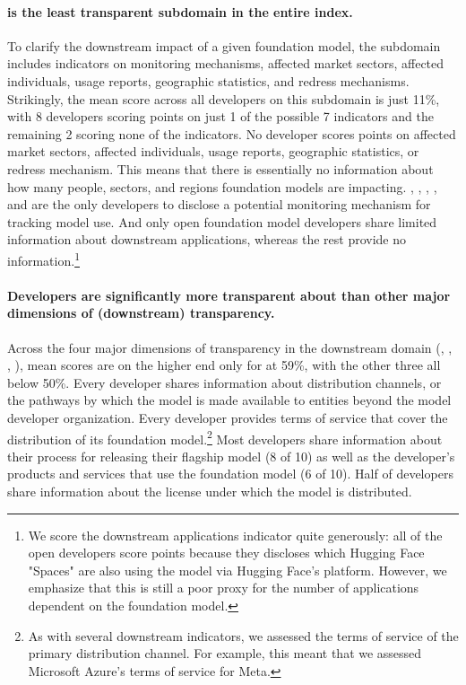 \documentclass[screen, authorversion, acmsmall]{acmart}
\begin{document}
\paragraph{\impact is the least transparent subdomain in the entire index.}
To clarify the downstream impact of a given foundation model, the \impact subdomain includes indicators on monitoring mechanisms, affected market sectors, affected individuals, usage reports, geographic statistics, and redress mechanisms.
Strikingly, the mean score across all developers on this subdomain is just 11\%, with 8 developers scoring points on just 1 of the possible 7 indicators and the remaining 2 scoring none of the indicators. 
No developer scores points on affected market sectors, affected individuals, usage reports, geographic statistics, or redress mechanism.
This means that there is essentially no information about how many people, sectors, and regions foundation models are impacting. 
\openai, \google, \cohere, \aitwentyone, and \inflection are the only developers to disclose a potential monitoring mechanism for tracking model use. 
And only open foundation model developers share limited information about downstream applications, whereas the rest provide no information.\footnote{We score the downstream applications indicator quite generously: all of the open developers score points because they discloses which Hugging Face "Spaces" are also using the model via Hugging Face's platform.
However, we emphasize that this is still a poor proxy for the number of applications dependent on the foundation model.} 

\paragraph{Developers are significantly more transparent about \distribution than other major dimensions of (downstream) transparency.}
Across the four major dimensions of transparency in the downstream domain (\distribution, \usagepolicy, \feedback, \impact), mean scores are on the higher end only for \distribution at 59\%, with the other three all below 50\%. 
Every developer shares information about distribution channels, or the pathways by which the model is made available to entities beyond the model developer organization.
Every developer provides terms of service that cover the distribution of its foundation model.\footnote{As with several downstream indicators, we assessed the terms of service of the primary distribution channel. For example, this meant that we assessed Microsoft Azure's terms of service for Meta.}
Most developers share information about their process for releasing their flagship model (8 of 10) as well as the developer's products and services that use the foundation model (6 of 10).
Half of developers share information about the license under which the model is distributed.
\end{document}
